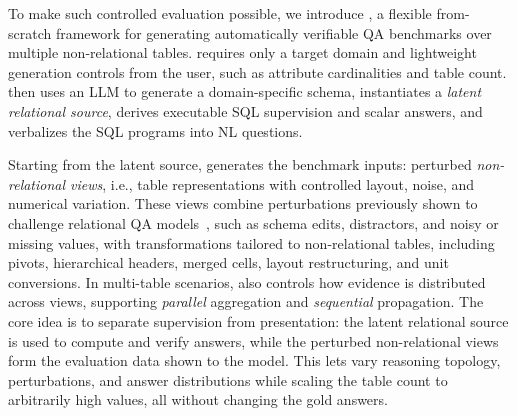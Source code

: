 
To make such controlled evaluation possible, we introduce \name, a flexible from-scratch framework for generating automatically verifiable QA benchmarks over multiple non-relational tables.
\name requires only a target domain and lightweight generation controls from the user, such as attribute cardinalities and table count. \name then uses an LLM to generate a domain-specific schema, instantiates a \emph{latent relational source}, derives executable SQL supervision and scalar answers, and verbalizes the SQL programs into NL questions.

Starting from the latent source, \name generates the benchmark inputs: perturbed \emph{non-relational views}, i.e., table representations with controlled layout, noise, and numerical variation. These views combine perturbations previously shown to challenge relational QA models~\cite{2.4,2.5,2.6,2.8}, such as schema edits, distractors, and noisy or missing values, with transformations tailored to non-relational tables, including pivots, hierarchical headers, merged cells, layout restructuring, and unit conversions. In multi-table scenarios, \name also controls how evidence is distributed across views, supporting \emph{parallel} aggregation and \emph{sequential} propagation. %
The core idea is to separate supervision from presentation: the latent relational source is used to compute and verify answers, while the perturbed non-relational views form the evaluation data shown to the model. %
This lets \name vary reasoning topology, perturbations, and answer distributions while scaling the table count to arbitrarily high values, all without changing the gold answers.

